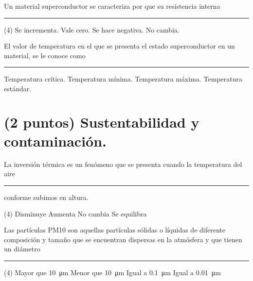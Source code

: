 \documentclass[12pt, letter]{exam}
\begin{document}
\begin{questions}
    \question Un material superconductor se caracteriza por que su resistencia interna \rule{2cm}{0.1mm}
    \begin{tasks}(4)
        \task Se incrementa.
        \task Vale cero.
        \task Se hace negativa.
        \task No cambia.
    \end{tasks}
    \question El valor de temperatura en el que se presenta el estado superconductor en un material, se le conoce como \rule{2cm}{0.1mm}
    \begin{multicols}{2}
    \begin{tasks}
        \task Temperatura crítica.
        \task Temperatura mínima.
        \task Temperatura máxima.
        \task Temperatura estándar.
    \end{tasks}
    \end{multicols}

    \section{(2 puntos) Sustentabilidad y contaminación.}

    \question La inversión térmica es un fenómeno que se presenta cuando la temperatura del aire \rule{2cm}{0.1mm} conforme subimos en altura.
    \begin{tasks}(4)
        \task Disminuye
        \task Aumenta
        \task No cambia
        \task Se equilibra
    \end{tasks}
    \question Las partículas PM10 son aquellas partículas sólidas o líquidas de diferente composición y tamaño que se encuentran dispersas en la atmósfera y que tienen un diámetro \rule{2cm}{0.1mm}
    \begin{tasks}(4)
        \task Mayor que \SI{10}{\micro\meter}
        \task Menor que \SI{10}{\micro\meter}
        \task Igual a \SI{0.1}{\micro\meter}
        \task Igual a \SI{0.01}{\micro\meter}
    \end{tasks}

\end{questions}

    \newpage
\end{document}
